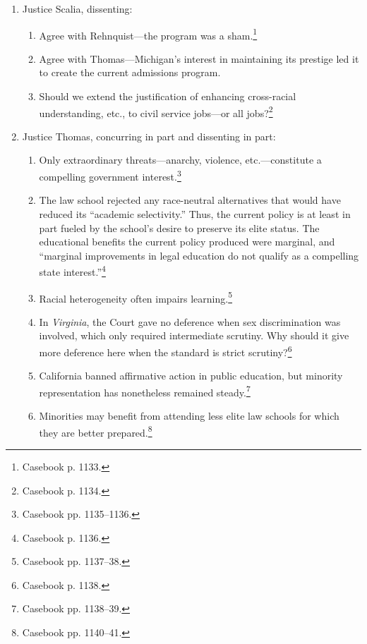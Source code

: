 \begin{enumerate}
\begin{enumerate}
        burden under strict scrutiny.\footnote{Casebook p. 1132.}
        \item The Court gives too much deference. ``Deference is antithetical 
        to strict scrutiny, not consistent with it.''\footnote{Casebook p. 
        1133.}
    \end{enumerate}
    \item Justice Scalia, dissenting:
    \begin{enumerate}
        \item Agree with Rehnquist---the program was a sham.\footnote{Casebook 
        p. 1133.}
        \item Agree with Thomas---Michigan's interest in maintaining its 
        prestige led it to create the current admissions program. 
        \item Should we extend the justification of enhancing cross-racial 
        understanding, etc., to civil service jobs---or all 
        jobs?\footnote{Casebook p. 1134.}
    \end{enumerate}
    \item Justice Thomas, concurring in part and dissenting in part:
    \begin{enumerate}
        \item Only extraordinary threats---anarchy, violence, 
        etc.---constitute a compelling government interest.\footnote{Casebook 
        pp. 1135--1136.}
        \item The law school rejected any race-neutral alternatives that would 
        have reduced its ``academic selectivity.'' Thus, the current policy is 
        at least in part fueled by the school's desire to preserve its elite 
        status. The educational benefits the current policy produced were 
        marginal, and ``marginal improvements in legal education do not 
        qualify as a compelling state interest.''\footnote{Casebook p. 1136.}
        \item Racial heterogeneity often impairs learning.\footnote{Casebook 
        pp. 1137--38.}
        \item In \emph{Virginia}, the Court gave no deference when sex 
        discrimination was involved, which only required intermediate 
        scrutiny. Why should it give more deference here when the standard is 
        strict scrutiny?\footnote{Casebook p. 1138.}
        \item California banned affirmative action in public education, but 
        minority representation has nonetheless remained 
        steady.\footnote{Casebook pp. 1138--39.}
        \item Minorities may benefit from attending less elite law schools for 
        which they are better prepared.\footnote{Casebook pp. 1140--41.}
    \end{enumerate}
\end{enumerate}
 
